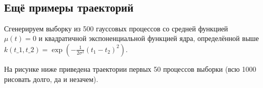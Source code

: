 \documentclass[11pt,a4paper]{article}
\begin{document}
    \begin{center}
    \end{center}
    { \hspace*{\fill} \\}
    
    \hypertarget{ux435ux449ux451-ux43fux440ux438ux43cux435ux440ux44b-ux442ux440ux430ux435ux43aux442ux43eux440ux438ux439}{%
\subsection{Ещё примеры
траекторий}\label{ux435ux449ux451-ux43fux440ux438ux43cux435ux440ux44b-ux442ux440ux430ux435ux43aux442ux43eux440ux438ux439}}

Сгенерируем выборку из 500 гауссовых процессов со средней функцией
\(\mu(t) = 0\) и квадратичной экспоненциальной функцией ядра,
определённой выше \( k(t\_1, t\_2) =
\exp{ \left( -\frac{1}{2\sigma^2} (t_1 - t_2)^2 \right) } \).

На рисунке ниже приведена траектории первых 50 процессов выборки (всю
1000 рисовать долго, да и незачем).
\end{document}
